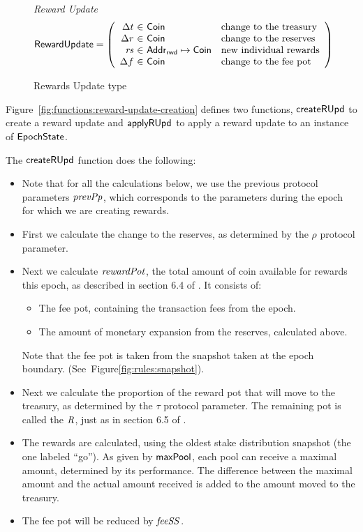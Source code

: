 \begin{figure}[htb]
  \emph{Reward Update}
  \begin{equation*}
    \RewardUpdate =
    \left(
      \begin{array}{r@{~\in~}ll}
        \Delta t & \Coin & \text{change to the treasury} \\
        \Delta r & \Coin & \text{change to the reserves} \\
        \var{rs} & \AddrRWD\mapsto\Coin & \text{new individual rewards} \\
        \Delta f & \Coin & \text{change to the fee pot} \\
      \end{array}
    \right)
  \end{equation*}
  \caption{Rewards Update type}
  \label{fig:defs:reward-update}
\end{figure}

\clearpage

Figure~\ref{fig:functions:reward-update-creation} defines two functions,
$\mathsf{createRUpd}$ to create a reward update and $\mathsf{applyRUpd}$ to apply a
reward update to an instance of $\mathsf{EpochState}$.

The $\mathsf{createRUpd}$ function does the following:
\begin{itemize}
  \item Note that for all the calculations below, we use the previous protocol parameters
    $\mathit{prevPp}$, which corresponds to the parameters during the epoch for which we
    are creating rewards.
  \item First we calculate the change to the reserves,
    as determined by the $\rho$ protocol parameter.
  \item Next we calculate $\mathit{rewardPot}$, the total amount of coin available for rewards this
    epoch, as described in section 6.4 of \cite{delegation_design}. It consists of:
    \begin{itemize}
      \item The fee pot, containing the transaction fees from the epoch.
      \item The amount of monetary expansion from the reserves, calculated above.
    \end{itemize}
    Note that the fee pot is taken from the snapshot taken at the epoch boundary.
    (See~Figure\ref{fig:rules:snapshot}).
  \item Next we calculate the proportion of the reward pot that will move to the treasury,
    as determined by the $\tau$ protocol parameter. The remaining pot is called the
    $\mathit{R}$, just as in section 6.5 of \cite{delegation_design}.
  \item The rewards are calculated, using the oldest stake distribution snapshot (the one
    labeled ``go'').
    As given by $\mathsf{maxPool}$, each pool can receive a maximal amount, determined by its
    performance.  The difference between the maximal amount and the actual amount received is
    added to the amount moved to the treasury.
  \item The fee pot will be reduced by $\mathit{feeSS}$.
\end{itemize}

